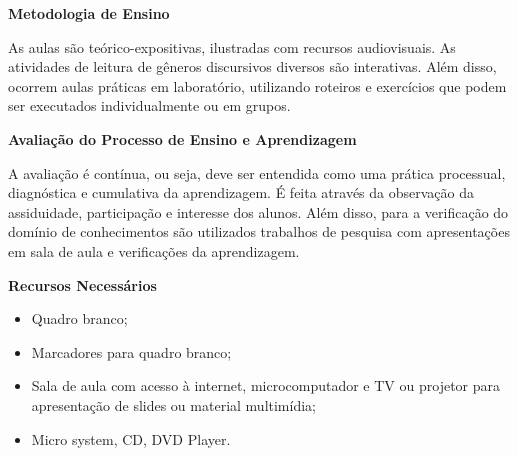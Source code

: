 






\begin{snugshade}\begin{center}\textbf{
    Metodologia de Ensino
}\end{center}\end{snugshade}

\noindent
As aulas são teórico-expositivas, ilustradas com recursos audiovisuais. As atividades de leitura de gêneros discursivos diversos são interativas. Além disso, ocorrem aulas práticas em laboratório, utilizando roteiros e exercícios que podem ser executados individualmente ou em grupos.

\begin{snugshade}\begin{center}\textbf{
    Avaliação do Processo de Ensino e Aprendizagem
}\end{center}\end{snugshade}

\noindent
           A avaliação é contínua, ou seja, deve ser entendida como uma prática processual, diagnóstica e cumulativa da aprendizagem. É feita através da observação da assiduidade, participação e interesse dos alunos. Além disso, para a verificação do domínio de conhecimentos são utilizados trabalhos de pesquisa com apresentações em sala de aula e verificações da aprendizagem.

\begin{snugshade}\begin{center}\textbf{
    Recursos Necessários
    \vphantom{q} %
}\end{center}\end{snugshade}

\begin{itemize}
  \item Quadro branco;
  \item Marcadores para quadro branco;
  \item Sala de aula com acesso à internet, microcomputador e TV ou projetor para apresentação de slides ou material multimídia;
  \item Micro system, CD, DVD Player.
\end{itemize}


